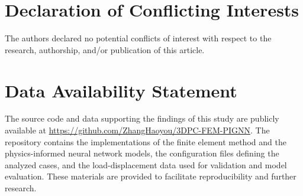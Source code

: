 \documentclass[review, authoryear, 12pt]{elsarticle}
\begin{document}
\section*{Declaration of Conflicting Interests}
The authors declared no potential conflicts of interest with respect to the research, authorship, and/or publication of this article.

\section*{Data Availability Statement}
The source code and data supporting the findings of this study are publicly available at \url{https://github.com/ZhangHaoyou/3DPC-FEM-PIGNN}. The repository contains the implementations of the finite element method and the physics-informed neural network models, the configuration files defining the analyzed cases, and the load-displacement data used for validation and model evaluation. These materials are provided to facilitate reproducibility and further research.



\end{document}
